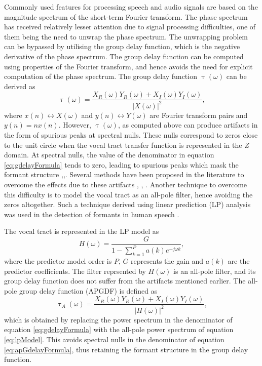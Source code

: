 \documentclass[a4paper]{article}
\begin{document}
Commonly used features for processing speech and audio signals are based on the
magnitude spectrum of the short-term Fourier transform. The phase spectrum has
received relatively lesser attention due to signal processing difficulties, one
of them being the need to unwrap the phase spectrum. The unwrapping problem can
be bypassed by utilising the group delay function, which is the negative
derivative of the phase spectrum. The group delay function can be computed using
properties of the Fourier transform, and hence avoids the need for explicit
computation of the phase spectrum. The group delay function
$\uptau(\omega)$ can be derived as \cite{gdDeriv}
\begin{equation}
\uptau(\omega) = \frac{X_R(\omega) Y_R(\omega) + X_I(\omega)
Y_I(\omega)}{|X(\omega)|^2},
\label{eq:gdelayFormula}
\end{equation}
where $x(n) \leftrightarrow X(\omega)$ and $y(n) \leftrightarrow Y(\omega)$ are
Fourier transform pairs and $y(n) = n x(n)$.  However, $\uptau(\omega)$, as
computed above can produce artifacts in the form of spurious peaks at spectral
nulls. These nulls correspond to zeros close to the unit circle when the vocal
tract transfer function is represented in the $Z$ domain.  At spectral nulls,
the value of the denominator in equation \ref{eq:gdelayFormula} tends to zero,
leading to spurious peaks which mask the formant structure
\cite{hema},\cite{hemaSigProc1989},\cite{chirpGD}.  Several methods have been
proposed in the literature to overcome the effects due to these artifacts
\cite{modgdf}, \cite{productSpectrum}, \cite{chirpGD}. Another technique to
overcome this difficulty is to model the vocal tract as an all-pole filter,
hence avoiding the zeros altogether. Such a technique derived using linear
prediction (LP) analysis was used in the detection of formants in human speech
\cite{yegnaFormant}. 

The vocal tract is represented in the LP model as
\begin{equation}
H(\omega) = \frac{G}{1-\sum_{k=1}^{P} a(k) e^{-j \omega k}},
\label{eq:lpModel}
\end{equation}
where the predictor model order is $P$, $G$ represents the gain and $a(k)$ are
the predictor coefficients\cite{makhoul}.
The filter reprsented by $H(\omega)$ is an all-pole filter, and its group delay
function does not suffer from the artifacts mentioned earlier. The all-pole 
group delay function (APGDF) is defined as
\begin{equation}
\uptau_A(\omega) = \frac{X_R(\omega) Y_R(\omega) + X_I(\omega)
Y_I(\omega)}{|H(\omega)|^2},
\label{eq:apGdelayFormula}
\end{equation}
which is obtained by replacing the power spectrum in the denominator of equation
\ref{eq:gdelayFormula} with the all-pole power spectrum of equation
\ref{eq:lpModel}. This avoids spectral nulls in the denominator of equation
\ref{eq:apGdelayFormula}, thus retaining the formant structure in the group
delay function.
\end{document}
